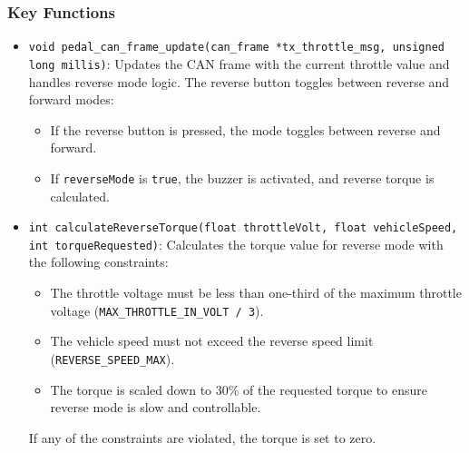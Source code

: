 \documentclass[a4paper,12pt]{article}
\begin{document}
\subsubsection{Key Functions}
\begin{itemize}
    \item \texttt{void pedal\_can\_frame\_update(can\_frame *tx\_throttle\_msg, unsigned long millis)}:
    Updates the CAN frame with the current throttle value and handles reverse mode logic. The reverse button toggles between reverse and forward modes:
    \begin{itemize}
        \item If the reverse button is pressed, the mode toggles between reverse and forward.
        \item If \texttt{reverseMode} is \texttt{true}, the buzzer is activated, and reverse torque is calculated.
    \end{itemize}

    \item \texttt{int calculateReverseTorque(float throttleVolt, float vehicleSpeed, int torqueRequested)}:
    Calculates the torque value for reverse mode with the following constraints:
    \begin{itemize}
        \item The throttle voltage must be less than one-third of the maximum throttle voltage (\texttt{MAX\_THROTTLE\_IN\_VOLT / 3}).
        \item The vehicle speed must not exceed the reverse speed limit (\texttt{REVERSE\_SPEED\_MAX}).
        \item The torque is scaled down to 30\% of the requested torque to ensure reverse mode is slow and controllable.
    \end{itemize}
    If any of the constraints are violated, the torque is set to zero.
\end{itemize}
\end{document}
